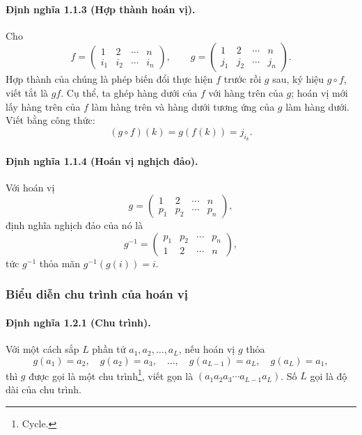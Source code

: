 \documentclass[11pt]{article}
\begin{document}
\paragraph{Định nghĩa 1.1.3 (Hợp thành hoán vị).}
Cho
\[
  f=
  \begin{pmatrix}
    1 & 2 & \cdots & n\\
    i_1 & i_2 & \cdots & i_n
  \end{pmatrix},
  \qquad
  g=
  \begin{pmatrix}
    1 & 2 & \cdots & n\\
    j_1 & j_2 & \cdots & j_n
  \end{pmatrix}.
\]
Hợp thành của chúng là phép biến đổi thực hiện \(f\) trước rồi \(g\) sau, ký
hiệu \(g\circ f\), viết tắt là \(gf\). Cụ thể, ta ghép hàng dưới của \(f\) với
hàng trên của \(g\); hoán vị mới lấy hàng trên của \(f\) làm hàng trên và hàng
dưới tương ứng của \(g\) làm hàng dưới. Viết bằng công thức:
\[
  (g\circ f)(k)=g(f(k))=j_{i_k}.
\]

\paragraph{Định nghĩa 1.1.4 (Hoán vị nghịch đảo).}
Với hoán vị
\[
  g=
  \begin{pmatrix}
    1 & 2 & \cdots & n\\
    p_1 & p_2 & \cdots & p_n
  \end{pmatrix},
\]
định nghĩa nghịch đảo của nó là
\[
  g^{-1}=
  \begin{pmatrix}
    p_1 & p_2 & \cdots & p_n\\
    1 & 2 & \cdots & n
  \end{pmatrix},
\]
tức \(g^{-1}\) thỏa mãn \(g^{-1}(g(i))=i\).

\subsubsection{Biểu diễn chu trình của hoán vị}

\paragraph{Định nghĩa 1.2.1 (Chu trình).}
Với một cách sắp \(L\) phần tử \(a_1,a_2,\ldots,a_L\), nếu hoán vị \(g\) thỏa
\[
  g(a_1)=a_2,\quad g(a_2)=a_3,\quad \ldots,\quad
  g(a_{L-1})=a_L,\quad g(a_L)=a_1,
\]
thì \(g\) được gọi là một chu trình\footnote{Cycle.}, viết gọn là
\((a_1a_2a_3\cdots a_{L-1}a_L)\). Số \(L\) gọi là độ dài của chu trình.
\end{document}
